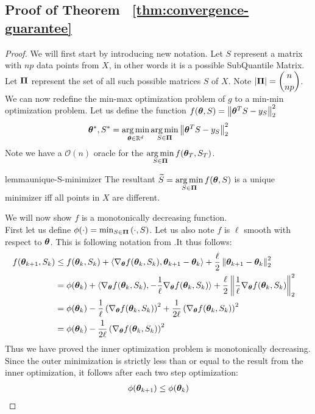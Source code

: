 \documentclass{article} %
\newcommand{\norm}[1]{\left\lVert#1\right\rVert}
\begin{document}
\begin{appendices}
	\subsection{Proof of Theorem ~\ref{thm:convergence-guarantee}}
	\begin{proof}
	We will first start by introducing new notation. Let $S$ represent a matrix with $np$ data points from $X$, in other words it is a possible SubQuantile Matrix. Let $\displaystyle{\bm{\Pi}}$ represent the set of all such possible matrices $S$ of $X$. Note $\displaystyle \left|{\bm{\Pi}}\right| = \binom{n}{np}$. We can now redefine the min-max optimization problem of $g$ to a min-min optimization problem. Let us define the function $f(\vtheta, S) = \norm{\vtheta^T S - y_S}_2^2$
	\begin{equation}
		\vtheta^*, S^* = \argmin_{\vtheta \in \mathbb{R}^d} \argmin_{S \in \vPi} \norm{\vtheta^T S - y_S}_2^2
	\end{equation}
	Note we have a $\mathcal{O}(n)$ oracle for the $\displaystyle \operatorname*{arg\,min}_{S\in {\bm{\Pi}}}f({\bm{\theta}}_T,S_T)$. 
	\begin{restatable}{lemma}{unique-S-minimizer}
		\label{lem:unique-S-minimizer}
		The resultant $\displaystyle \widetilde{S} = \operatorname*{arg\,min}_{S \in {\bm{\Pi}}} f({\bm{\theta}},S)$ is a unique minimizer iff all points in $X$ are different. 
	\end{restatable}
	We will now show $f$ is a monotonically decreasing function.\\
	First let us define $\phi(\cdot) = \min_{S \in {\bm{\Pi}}}\left(\cdot,S\right)$. 
	Let us also note $f$ is $\ell$ smooth with respect to ${\bm{\theta}}$. This is following notation from \cite{Jin_2019}.It thus follows:
	\begin{align*}
		f(\vtheta_{k+1}, S_k) &\leq f(\vtheta_k, S_k) + \langle\nabla_\vtheta f(\vtheta_k,S_k), \vtheta_{k+1}-\vtheta_k \rangle + \frac{\ell}{2}\norm{\vtheta_{k+1}-\vtheta_k}_2^2 &&\\
		&= \phi(\vtheta_k) + \langle\nabla_\vtheta f(\vtheta_k,S_k), -\frac{1}{\ell}\nabla_\vtheta f(\vtheta_k,S_k)\rangle + \frac{\ell}{2}\norm{\frac{1}{\ell}\nabla_\vtheta f(\vtheta_k,S_k)}_2^2 &&\\
		&= \phi(\vtheta_k) - \frac{1}{\ell}\left(\nabla_\vtheta f(\vtheta_k,S_k)\right)^2 + \frac{1}{2\ell}\left(\nabla_\vtheta f(\vtheta_k,S_k)\right)^2 &&\\
		&= \phi(\vtheta_k) - \frac{1}{2\ell}\left(\nabla_\vtheta f(\vtheta_k,S_k)\right)^2 &&\\
	\end{align*} 
	Thus we have proved the inner optimization problem is monotonically decreasing. Since the outer minimization is strictly less than or equal to the result from the inner optimization, it follows after each two step optimization: 
	\begin{align*}
		\phi({\bm{\theta}}_{k+1}) \leq \phi({\bm{\theta}}_k)
	\end{align*}
	

\end{proof}
\end{appendices}
\end{document}
